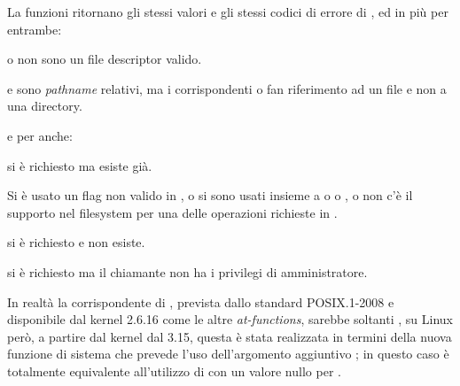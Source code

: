 \begin{funcproto}{
}

{La funzioni ritornano gli stessi valori e gli stessi codici di errore di
  , ed in più per entrambe:
  \begin{errlist}
  \item[\errcode{EBADF}]  o  non sono un file
    descriptor valido.
  \item[\errcode{ENOTDIR}]  e  sono
    \textit{pathname} relativi, ma i corrispondenti  o
     fan riferimento ad un file e non a una directory.
  \end{errlist}
  e per  anche:
  \begin{errlist}
  \item[\errcode{EEXIST}] si è richiesto  ma
     esiste già.
  \item[\errcode{EINVAL}] Si è usato un flag non valido in , o si
    sono usati insieme a  o 
    o , o non c'è il supporto nel filesystem per una
    delle operazioni richieste in .
  \item[\errcode{ENOENT}] si è richiesto  e
     non esiste.
  \item[\errcode{EPERM}] si è richiesto  ma il
    chiamante non ha i privilegi di amministratore.
  \end{errlist}
}  
\end{funcproto}

In realtà la corrispondente di , prevista dallo standard
POSIX.1-2008 e disponibile dal kernel 2.6.16 come le altre
\textit{at-functions}, sarebbe soltanti , su Linux però, a
partire dal kernel dal 3.15, questa è stata realizzata in termini della nuova
funzione di sistema  che prevede l'uso dell'argomento
aggiuntivo ; in questo caso  è totalmente
equivalente all'utilizzo di  con un valore nullo per
.

